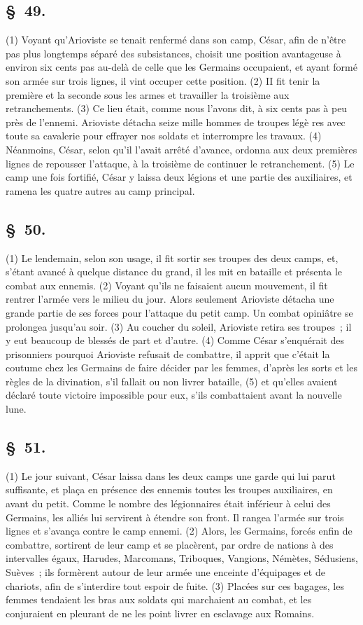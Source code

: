 \documentclass[french,twoside]{book} %
\begin{document}
\subsection[{§ 49.}]{ \textsc{§ 49.} }
\noindent (1) Voyant qu’Arioviste se tenait renfermé dans son camp, César, afin de n’être pas plus longtemps séparé des subsistances, choisit une position avantageuse à environ six cents pas au-delà de celle que les Germains occupaient, et ayant formé son armée sur trois lignes, il vint occuper cette position. (2) II fit tenir la première et la seconde sous les armes et travailler la troisième aux retranchements. (3) Ce lieu était, comme nous l’avons dit, à six cents pas à peu près de l’ennemi. Arioviste détacha seize mille hommes de troupes légè res avec toute sa cavalerie pour effrayer nos soldats et interrompre les travaux. (4) Néanmoins, César, selon qu’il l’avait arrêté d’avance, ordonna aux deux premières lignes de repousser l’attaque, à la troisième de continuer le retranchement. (5) Le camp une fois fortifié, César y laissa deux légions et une partie des auxiliaires, et ramena les quatre autres au camp principal.
\subsection[{§ 50.}]{ \textsc{§ 50.} }
\noindent (1) Le lendemain, selon son usage, il fit sortir ses troupes des deux camps, et, s’étant avancé à quelque distance du grand, il les mit en bataille et présenta le combat aux ennemis. (2) Voyant qu’ils ne faisaient aucun mouvement, il fit rentrer l’armée vers le milieu du jour. Alors seulement Arioviste détacha une grande partie de ses forces pour l’attaque du petit camp. Un combat opiniâtre se prolongea jusqu’au soir. (3) Au coucher du soleil, Arioviste retira ses troupes ; il y eut beaucoup de blessés de part et d’autre. (4) Comme César s’enquérait des prisonniers pourquoi Arioviste refusait de combattre, il apprit que c’était la coutume chez les Germains de faire décider par les femmes, d’après les sorts et les règles de la divination, s’il fallait ou non livrer bataille, (5) et qu’elles avaient déclaré toute victoire impossible pour eux, s’ils combattaient avant la nouvelle lune.
\subsection[{§ 51.}]{ \textsc{§ 51.} }
\noindent (1) Le jour suivant, César laissa dans les deux camps une garde qui lui parut suffisante, et plaça en présence des ennemis toutes les troupes auxiliaires, en avant du petit. Comme le nombre des légionnaires était inférieur à celui des Germains, les alliés lui servirent à étendre son front. Il rangea l’armée sur trois lignes et s’avança contre le camp ennemi. (2) Alors, les Germains, forcés enfin de combattre, sortirent de leur camp et se placèrent, par ordre de nations à des intervalles égaux, Harudes, Marcomans, Triboques, Vangions, Némètes, Sédusiens, Suèves ; ils formèrent autour de leur armée une enceinte d’équipages et de chariots, afin de s’interdire tout espoir de fuite. (3) Placées sur ces bagages, les femmes tendaient les bras aux soldats qui marchaient au combat, et les conjuraient en pleurant de ne les point livrer en esclavage aux Romains.
\end{document}
